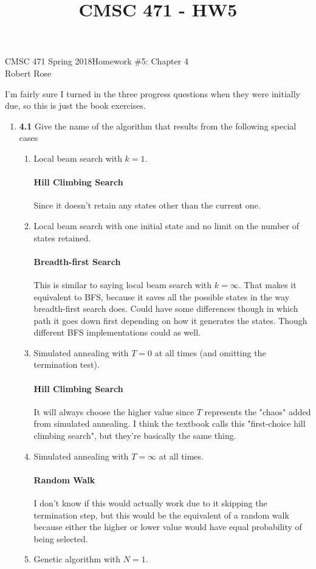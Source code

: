 \documentclass[12pt]{article}
\title{CMSC 471 - HW5}
\begin{document}
CMSC 471 Spring 2018\hfill Homework \#5: Chapter 4\\
Robert Rose

\hrulefill
I'm fairly sure I turned in the three progress questions when they were initially due, so this is just the book exercises.
\begin{enumerate}
\item \textbf{4.1} Give the name of the algorithm that results from the following special cases
  \begin{enumerate}
  \item Local beam search with $k = 1$.\\
  \vspace{-2.5em}
  \paragraph{Hill Climbing Search} Since it doesn't retain any states other than the current one.
  \item Local beam search with one initial state and no limit on the number of states retained.\\
  \vspace{-2.5em}
  \paragraph{Breadth-first Search} This is similar to saying local beam search with $k = \infty$. That makes it equivalent to BFS, because it saves all the possible states in the way breadth-first search does. Could have some differences though in which path it goes down first depending on how it generates the states. Though different BFS implementations could as well.
  \item Simulated annealing with $T = 0$ at all times (and omitting the termination test).\\
  \vspace{-2.5em}
  \paragraph{Hill Climbing Search} It will always choose the higher value since $T$ represents the "chaos" added from simulated annealing. I think the textbook calls this "first-choice hill climbing search", but they're basically the same thing.
  \item Simulated annealing with $T = \infty$ at all times.\\
  \vspace{-2.5em}
  \paragraph{Random Walk} I don't know if this would actually work due to it skipping the termination step, but this would be the equivalent of a random walk because either the higher or lower value would have equal probability of being selected.
  \item Genetic algorithm with $N = 1$.\\
  \vspace{-2.5em}

\end{enumerate}
\end{enumerate}
\end{document}
